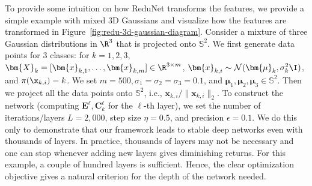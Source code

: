 \documentclass[../../book-main.tex]{subfiles}
\begin{document}
\begin{example}
To provide some intuition on how ReduNet transforms the features, we provide a simple example with mixed 3D Gaussians and visualize how the features are transformed in Figure~\ref{fig:redu-3d-gaussian-diagram}. 
Consider a mixture of three Gaussian distributions in $\R^{3}$ that is projected onto $\mathbb{S}^2$. We first generate data points for 3 classes: for $k=1,2,3$, $\bm{X}_{k}=[\bm{x}_{k,1}, \ldots, \bm{x}_{k,m}] \in \R^{3\times m}$, $\bm{x}_{k,i} \sim \mathcal{N}(\bm{\mu}_{k}, \sigma_{k}^{2} \I)$, and ${\pi}(\x_{k,i}) = k$.
We set $m=500, \sigma_{1}=\sigma_{2}=\sigma_{3}=0.1$, and $\bm{\mu}_{1}, \bm{\mu}_{2}, \bm{\mu}_{3} \in \mathbb{S}^2$. 
Then we project all the data points onto $\mathbb{S}^{2}$, i.e., $\bm{x}_{k,i}/\|\bm{x}_{k,i}\|_{2}$. 
To construct the network (computing $\bm{E}^{\ell}, \bm{C}^{\ell}_{k}$ for the $\ell$-th layer), we set the number of iterations/layers $L=2,000$, step size $\eta=0.5$, and precision $\epsilon=0.1$. 
We do this only to demonstrate that our framework leads to stable deep networks even with thousands of layers. 
In practice, thousands of layers may not be necessary and one can stop whenever adding new layers gives diminishing returns. 
For this example, a couple of hundred layers is sufficient. Hence, the clear optimization objective gives a natural criterion for the depth of the network needed.


\end{example}
\end{document}
